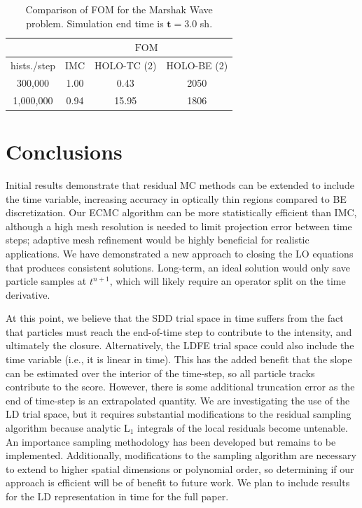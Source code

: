 \documentclass{anstrans}
\newcommand{\FOM}{\ensuremath{\text{FOM}}}
\begin{document}
\begin{table}[H]
\centering
\caption{\label{tab:marshak_cont} {Comparison of FOM for the Marshak
    Wave problem.  Simulation end time is $\mathbf{t=3.0}$ sh.}}
\begin{tabular}{|c|ccc|}\cline{2-4}
    \multicolumn{1}{c|}{}        &
    \multicolumn{3}{|c|}{\FOM} \\ \hline
hists./step    &  IMC   & HOLO-TC (2) & HOLO-BE (2) \\ \hline
  300,000      &  1.00  &   0.43    & 2050          \\  
  1,000,000    &  0.94  &  15.95    & 1806          \\ \hline
\end{tabular}
\end{table}


\section{Conclusions}

Initial results demonstrate that residual MC methods can be extended to include the time
variable, increasing accuracy in optically thin regions compared to BE discretization.  Our ECMC algorithm can be more statistically efficient than IMC, although a
high mesh resolution is needed to limit projection error between time steps; adaptive mesh refinement would be
highly beneficial for realistic applications.  We have demonstrated a new approach to
closing the LO equations that produces consistent solutions. Long-term, an ideal solution
would only save particle samples at $t^{n+1}$, which will likely require an operator split
on the time derivative.

At this point, we believe that the SDD trial space in time suffers from the fact that particles must
reach the end-of-time step to contribute to the intensity, and ultimately the closure.  Alternatively, the LDFE trial space
could also include the time variable (i.e., it is linear in time).  This has the added
benefit that the slope can be estimated over the interior of the time-step, so all
particle tracks contribute to the score.  However, there is some additional truncation
error as the end of time-step is an extrapolated quantity.  We are investigating the use
of the LD trial space, but it requires substantial modifications to the residual sampling
algorithm because analytic L$_1$ integrals of the local residuals become untenable.  An
importance sampling methodology has been developed but remains to be implemented.  Additionally, modifications to the sampling
algorithm are necessary to extend to higher spatial dimensions or polynomial order, so determining if our
approach is efficient will be of benefit to future work. We plan to include results
for the LD representation in time for the full paper. 





\end{document}
